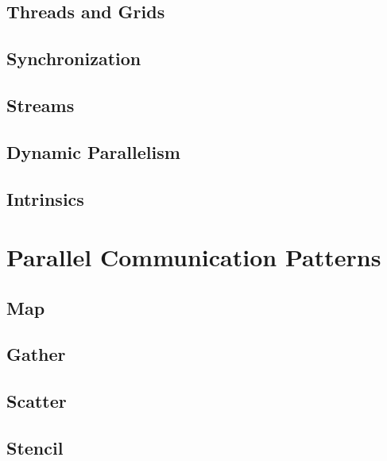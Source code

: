 \documentclass[12px,oz]{report}
\begin{document}
	\section{Threads and Grids}
	\label{sec-pm-threads}
	
	
	\section{Synchronization}
	\label{sec-pm-synch}
	
	
	\section{Streams}
	\label{sec-pm-streams}
		
	
	\section{Dynamic Parallelism}
	\label{sec-pm-dynamic}
	
	
	\section{Intrinsics}
	\label{sec-pm-intrinsics}
	


\chapter{Parallel Communication Patterns}
\label{ch-patterns}

	
	\section{Map}
	\label{sec-map}
	
	
	\section{Gather}
	\label{sec-gather}
	
	
	\section{Scatter}
	\label{sec-scatter}
	
	
	\section{Stencil}
	\label{sec-stencil}
	
	
\end{document}
